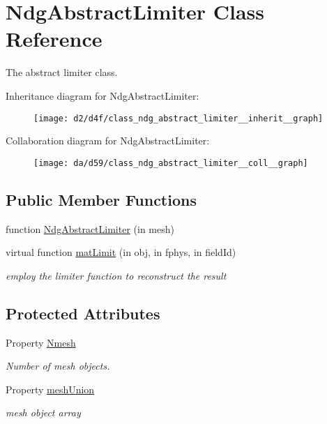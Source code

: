 \hypertarget{class_ndg_abstract_limiter}{}\section{Ndg\+Abstract\+Limiter Class Reference}
\label{class_ndg_abstract_limiter}


The abstract limiter class.  




Inheritance diagram for Ndg\+Abstract\+Limiter\+:
\nopagebreak
\begin{figure}[H]
\begin{center}
\leavevmode
\texttt{[image: d2/d4f/class\_ndg\_abstract\_limiter\_\_inherit\_\_graph]}
\end{center}
\end{figure}


Collaboration diagram for Ndg\+Abstract\+Limiter\+:
\nopagebreak
\begin{figure}[H]
\begin{center}
\leavevmode
\texttt{[image: da/d59/class\_ndg\_abstract\_limiter\_\_coll\_\_graph]}
\end{center}
\end{figure}
\subsection*{Public Member Functions}
\begin{DoxyCompactItemize}
\item 
function \hyperlink{class_ndg_abstract_limiter_aeadf42ad0a49f55756d7c69b3797ee31}{Ndg\+Abstract\+Limiter} (in mesh)
\item 
virtual function \hyperlink{class_ndg_abstract_limiter_a8f4cac5fdb4705c686c64001b356f885}{mat\+Limit} (in obj, in fphys, in field\+Id)
\begin{DoxyCompactList}\small\item\em employ the limiter function to reconstruct the result \end{DoxyCompactList}\end{DoxyCompactItemize}
\subsection*{Protected Attributes}
\begin{DoxyCompactItemize}
\item 
Property \hyperlink{class_ndg_abstract_limiter_a3209227fdbccea468f4c1e43649de9e0}{Nmesh}
\begin{DoxyCompactList}\small\item\em Number of mesh objects. \end{DoxyCompactList}\item 
Property \hyperlink{class_ndg_abstract_limiter_abf2440c93b82a32bb9702a143b688ef2}{mesh\+Union}
\begin{DoxyCompactList}\small\item\em mesh object array \end{DoxyCompactList}\end{DoxyCompactItemize}


